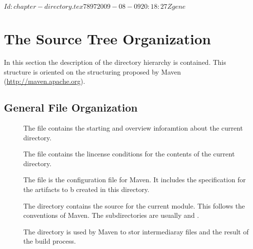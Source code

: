 \SVN$Id: chapter-directory.tex 7897 2009-08-09 20:18:27Z gene $
\chapter{The Source Tree Organization}

In this section the description of the directory hierarchy is
contained. This structure is oriented on the structuring proposed by
Maven (\url{http://maven.apache.org}).


\section{General File Organization}


\begin{description}
\item[] The file  contains the
  starting and overview inforamtion about the current directory.
\item[] The file  contains the
  lincense conditions for the contents of the current directory.
\item[] The file  is the configuration
  file for Maven. It includes the specification for the artifacts to b
  created in this directory.
\item[] The directory  contains the source for the
  current module. This follows the conventions of Maven. The
  subdirectories are usually  and . 
\item[] The directory  is used by Maven to
  stor intermediaray files and the result of the build process.
\end{description}


